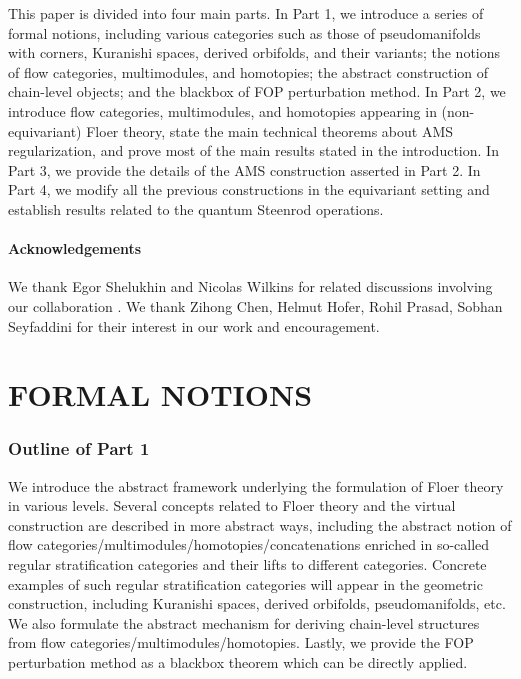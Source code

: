 \documentclass[reqno, 10pt]{amsart}
\numberwithin{equation}{section}
\numberwithin{equation}{section}
\theoremstyle{definition}
\theoremstyle{remark}
\begin{document}
This paper is divided into four main parts. In Part 1, we introduce a series of formal notions, including various categories such as those of pseudomanifolds with corners, Kuranishi spaces, derived orbifolds, and their variants; the notions of flow categories, multimodules, and homotopies; the abstract construction of chain-level objects; and the blackbox of FOP perturbation method. In Part 2, we introduce flow categories, multimodules, and homotopies appearing in (non-equivariant) Floer theory, state the main technical theorems about AMS regularization, and prove most of the main results stated in the introduction. In Part 3, we provide the details of the AMS construction asserted in Part 2. In Part 4, we modify all the previous constructions in the equivariant setting and establish results related to the quantum Steenrod operations.

\subsection{Acknowledgements}

We thank Egor Shelukhin and Nicolas Wilkins for related discussions involving our collaboration \cite{BSWX}. We thank Zihong Chen, Helmut Hofer, Rohil Prasad, Sobhan Seyfaddini for their interest in our work and encouragement. 




\newpage

\part{FORMAL NOTIONS}

\section*{Outline of Part 1}

We introduce the abstract framework underlying the formulation of Floer theory in various levels. Several concepts related to Floer theory and the virtual construction are described in more abstract ways, including the abstract notion of flow categories/multimodules/homotopies/concatenations enriched in so-called regular stratification categories and their lifts to different categories. Concrete examples of such regular stratification categories will appear in the geometric construction, including Kuranishi spaces, derived orbifolds, pseudomanifolds, etc. We also formulate the abstract mechanism for deriving chain-level structures from flow categories/multimodules/homotopies. Lastly, we provide the FOP perturbation method as a blackbox theorem which can be directly applied. 
\end{document}

